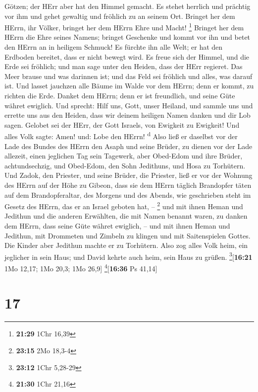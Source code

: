 Götzen; der HErr aber hat den Himmel gemacht.  Es stehet
herrlich und prächtig vor ihm und gehet gewaltig und fröhlich zu an
seinem Ort.  Bringet her dem HErrn, ihr Völker, bringet
her dem HErrn Ehre und Macht! \footnote{\textbf{21:29} 1Chr 16,39}
 Bringet her dem HErrn die Ehre seines Namens; bringet
Geschenke und kommt vor ihn und betet den HErrn an in heiligem Schmuck!
 Es fürchte ihn alle Welt; er hat den Erdboden bereitet,
dass er nicht bewegt wird.  Es freue sich der Himmel, und
die Erde sei fröhlich; und man sage unter den Heiden, dass der HErr
regieret.  Das Meer brause und was darinnen ist; und das
Feld sei fröhlich und alles, was darauf ist.  Und lasset
jauchzen alle Bäume im Walde vor dem HErrn; denn er kommt, zu richten
die Erde.  Danket dem HErrn; denn er ist freundlich, und
seine Güte währet ewiglich.  Und sprecht: Hilf uns, Gott,
unser Heiland, und sammle uns und errette uns aus den Heiden, dass wir
deinem heiligen Namen danken und dir Lob sagen.  Gelobet
sei der HErr, der Gott Israels, von Ewigkeit zu Ewigkeit! Und alles Volk
sagte: Amen! und: Lobe den HErrn! \textsuperscript{d} 
Also ließ er daselbst vor der Lade des Bundes des HErrn den Asaph und
seine Brüder, zu dienen vor der Lade allezeit, einen jeglichen Tag sein
Tagewerk,  aber Obed-Edom und ihre Brüder,
achtundsechzig, und Obed-Edom, den Sohn Jedithuns, und Hosa zu
Torhütern.  Und Zadok, den Priester, und seine Brüder,
die Priester, ließ er vor der Wohnung des HErrn auf der Höhe zu Gibeon,
 dass sie dem HErrn täglich Brandopfer täten auf dem
Brandopferaltar, des Morgens und des Abends, wie geschrieben steht im
Gesetz des HErrn, das er an Israel geboten hat, -- \footnote{\textbf{23:15}
  2Mo 18,3-4}  und mit ihnen Heman und Jedithun und die
anderen Erwählten, die mit Namen benannt waren, zu danken dem HErrn,
dass seine Güte währet ewiglich, --  und mit ihnen Heman
und Jedithun, mit Drommeten und Zimbeln zu klingen und mit Saitenspielen
Gottes. Die Kinder aber Jedithun machte er zu Torhütern. 
Also zog alles Volk heim, ein jeglicher in sein Haus; und David kehrte
auch heim, sein Haus zu grüßen. \footnote{\textbf{23:12} 1Chr 5,28-29}{[}\textbf{16:21}
1Mo 12,17; 1Mo 20,3; 1Mo 26,9{]} \footnote{\textbf{21:30} 1Chr 21,16}{[}\textbf{16:36}
Ps 41,14{]}

\hypertarget{section-16}{%
\section{17}\label{section-16}}

